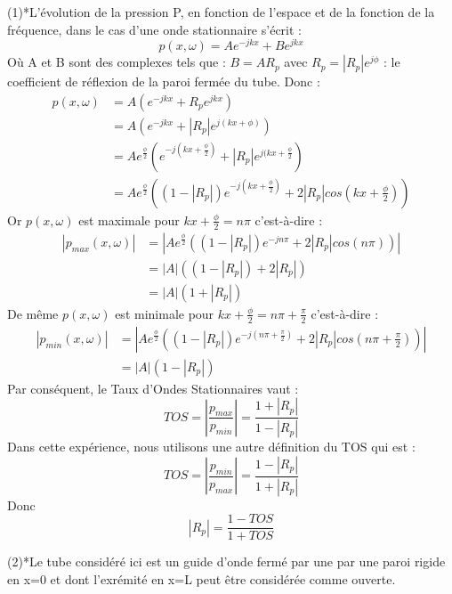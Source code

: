 \documentclass[a4paper,11pt]{article}
\begin{document}
(1)*L'évolution de la pression P, en fonction de l'espace et de la fonction de la fréquence, dans le cas d'une onde stationnaire s'écrit :
$$p(x,\omega) = Ae^{-jkx} + Be^{jkx}$$
Où A et B sont des complexes tels que : $B = AR_{p}$ avec $R_{p} =|R_{p}|e^{j\phi}$ : le coefficient de réflexion de la paroi fermée du tube.
\newline
Donc :
\begin{align*}
p(x,\omega) &= A(e^{-jkx} + R_{p}e^{jkx}) \\
			&= A(e^{-jkx} + |R_{p}|e^{j(kx+\phi)}) \\
			&= Ae^{\frac{\phi}{2}}(e^{-j(kx+\frac{\phi}{2})} + |R_{p}|e^{j(kx+\frac{\phi}{2}}) \\
			&= Ae^{\frac{\phi}{2}}((1-|R_{p}|)e^{-j(kx+\frac{\phi}{2})} + 2|R_{p}|cos(kx+\frac{\phi}{2}))
\end{align*}
\newline
Or $p(x,\omega)$ est maximale pour $kx+\frac{\phi}{2} = n \pi$ c'est-à-dire : 
\newline
\begin{align*}
|p_{max}(x,\omega)| &= |Ae^{\frac{\phi}{2}}((1-|R_{p}|)e^{-jn \pi} + 2|R_{p}|cos(n \pi))| \\
			      &= |A|((1-|R_{p}|)+ 2|R_{p}|) \\
			      &= |A|(1+ |R_{p}|)
\end{align*}
\newline
De même $p(x,\omega)$ est minimale pour $kx+\frac{\phi}{2} = n \pi +   \frac{\pi}{2}$ c'est-à-dire : 
\newline
\begin{align*}
|p_{min}(x,\omega)| &= |Ae^{\frac{\phi}{2}}((1-|R_{p}|)e^{-j(n \pi +\frac{\pi}{2})} + 2|R_{p}|cos(n \pi +\frac{\pi}{2}))| \\
			      &= |A|(1 - |R_{p}|)
\end{align*}
\newline
Par conséquent, le Taux d'Ondes Stationnaires vaut : $$TOS = |\frac{p_{max}}{p_{min}}| = \frac{1+ |R_{p}|}{1 - |R_{p}|} $$
\newline
Dans cette expérience, nous utilisons une autre définition du TOS qui est : $$TOS = |\frac{p_{min}}{p_{max}}| = \frac{1- |R_{p}|}{1 + |R_{p}|} $$
Donc $$|R_{p}| = \frac{1-TOS}{1+TOS}$$
\newline
\newline
\newline

(2)*Le tube considéré ici est un guide d'onde fermé par une par une paroi rigide en x=0 et dont l'exrémité en x=L peut être considérée comme ouverte.
\end{document}
